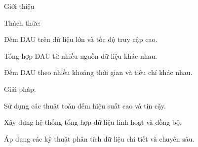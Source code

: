 \documentclass[10pt]{beamer}
\newcommand{\SubItem}[1]{
    {\setlength\itemindent{15pt} \item[-] #1}
}
\begin{document}
\begin{frame}[fragile]{Giới thiệu}
\begin{itemize}
  \item Thách thức:
  \SubItem{Đếm DAU trên dữ liệu lớn và tốc độ truy cập cao.}
  \SubItem{Tổng hợp DAU từ nhiều nguồn dữ liệu khác nhau.}
  \SubItem{Đếm DAU theo nhiều khoảng thời gian và tiêu chí khác nhau.}
  \item Giải pháp:
  \SubItem{Sử dụng các thuật toán đếm hiệu suất cao và tin cậy.}
  \SubItem{Xây dựng hệ thống tổng hợp dữ liệu linh hoạt và đồng bộ.}
  \SubItem{Áp dụng các kỹ thuật phân tích dữ liệu chi tiết và chuyên sâu.}
\end{itemize}
\end{frame}

\end{document}
